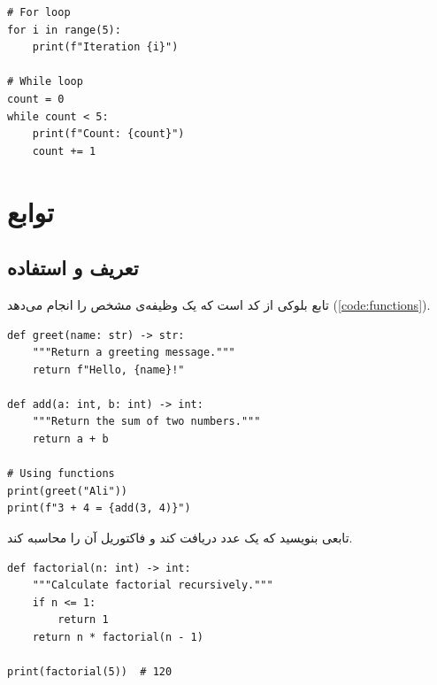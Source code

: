 \documentclass{matinbook}
\begin{document}
\begin{latin}
\begin{verbatim}
# For loop
for i in range(5):
    print(f"Iteration {i}")

# While loop
count = 0
while count < 5:
    print(f"Count: {count}")
    count += 1
\end{verbatim}
\end{latin}
\label{code:loops}

\chapter{توابع}
\label{chap:functions}

\section{تعریف و استفاده}
\label{sec:functions-definition}

تابع بلوکی از کد است که یک وظیفه‌ی مشخص
را انجام می‌دهد (\cref{code:functions}).

\begin{latin}
\begin{verbatim}
def greet(name: str) -> str:
    """Return a greeting message."""
    return f"Hello, {name}!"

def add(a: int, b: int) -> int:
    """Return the sum of two numbers."""
    return a + b

# Using functions
print(greet("Ali"))
print(f"3 + 4 = {add(3, 4)}")
\end{verbatim}
\end{latin}
\label{code:functions}

\begin{exercise}
    تابعی بنویسید که یک عدد دریافت کند و فاکتوریل آن
    را محاسبه کند.
    \label{exc:factorial}
\end{exercise}

\begin{solution}
    \begin{latin}
\begin{verbatim}
def factorial(n: int) -> int:
    """Calculate factorial recursively."""
    if n <= 1:
        return 1
    return n * factorial(n - 1)

print(factorial(5))  # 120
\end{verbatim}
    \end{latin}
\end{solution}
\end{document}
